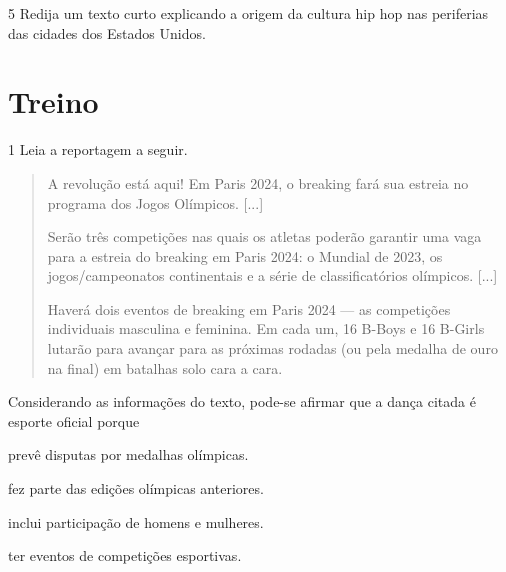 
\num{5} Redija um texto curto explicando a origem da cultura hip hop
nas periferias das cidades dos Estados Unidos.



\section*{Treino}

\num{1} Leia a reportagem a seguir.

\begin{quote}
A revolução está aqui! Em Paris 2024, o breaking fará sua
estreia no programa dos Jogos Olímpicos. {[}...{]}

Serão três competições nas quais os atletas poderão garantir uma vaga
para a estreia do breaking em Paris 2024: o Mundial de 2023, os
jogos/campeonatos continentais e a série de classificatórios olímpicos.
{[}...{]}

Haverá dois eventos de breaking em Paris 2024 --- as competições
individuais masculina e feminina. Em cada um, 16 B-Boys e 16 B-Girls
lutarão para avançar para as próximas rodadas (ou pela medalha de ouro
na final) em batalhas solo cara a cara.

\end{quote}

Considerando as informações do texto, pode-se afirmar que a dança citada
é esporte oficial porque

\begin{escolha}
\item prevê disputas por medalhas olímpicas.

\item fez parte das edições olímpicas anteriores.

\item inclui participação de homens e mulheres.

\item ter eventos de competições esportivas.
\end{escolha}


